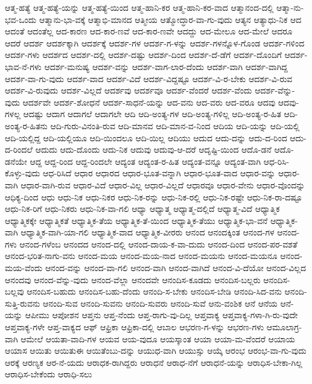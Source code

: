 {ಆತ್ಮ-ಹತ್ಯೆ
ಆತ್ಮ-ಹತ್ಯೆ-ಯನ್ನು
ಆತ್ಮ-ಹತ್ಯೆ-ಯಿಂದ
ಆತ್ಮ-ಹಾನಿ-ಕರ
ಆತ್ಮ-ಹಾನಿ-ಕರ-ವಾದ
ಆತ್ಮಾನಂದ-ದಲ್ಲಿ
ಆತ್ಮಾ-ನು-ಭವ-ಒಂದು
ಆತ್ಮಾನು-ಭಾ-ವಕ್ಕೆ
ಆತ್ಮಾಭಿ-ಮಾನದ
ಆತ್ಮೀಯ
ಆತ್ಮೋದ್ಧಾರ-ವಾ-ಗು-ವುದು
ಆತ್ಯನ
ಆತ್ಯಾಧು-ನಿಕ
ಆದ
ಆದಂತೆ
ಆದಂತೆಲ್ಲ
ಆದ-ಕಾರಣ
ಆದ-ಕಾರ-ಣವೆ
ಆದ-ಕಾರ-ಣವೇ
ಆದದ್ದು
ಆದ-ಮೇಲೂ
ಆದ-ಮೇಲೆ
ಆದರೂ
ಆದರೆ
ಆದರ್ಶ
ಆದರ್ಶಕ್ಕಾಗಿ
ಆದರ್ಶಕ್ಕೆ
ಆದರ್ಶ-ಗಳ
ಆದರ್ಶ-ಗ-ಳನ್ನು
ಆದರ್ಶ-ಗಳನ್ನೊಳ-ಗೊಂಡ
ಆದರ್ಶ-ಗಳಿಂದ
ಆದರ್ಶ-ಗಳು
ಆದರ್ಶದ
ಆದರ್ಶ-ದಲ್ಲಿ
ಆದರ್ಶ-ದಷ್ಟು
ಆದರ್ಶ-ದಿಂದ
ಆದರ್ಶ-ದೆ-ಡೆಗೆ
ಆದರ್ಶ-ದೊಂದಿಗೆ
ಆದರ್ಶ-ಭಾವ-ನೆ-ಗಳು
ಆದರ್ಶ-ಮನುಷ್ಯ
ಆದರ್ಶ-ವನ್ನು
ಆದರ್ಶ-ವಾಗ-ಲಾರ-ದೆಂದು
ಆದರ್ಶ-ವಾಗಿ
ಆದರ್ಶ-ವಾಗಿದ್ದ
ಆದರ್ಶ-ವಾ-ಗು-ವುದು
ಆದರ್ಶ-ವಾದ
ಆದರ್ಶ-ವಿದೆ
ಆದರ್ಶ-ವಿದ್ದಷ್ಟೂ
ಆದರ್ಶ-ವಿ-ರ-ಬೇಕು
ಆದರ್ಶ-ವಿ-ರುವ
ಆದರ್ಶ-ವಿ-ರುವುದು
ಆದರ್ಶ-ವಿಲ್ಲದೆ
ಆದರ್ಶವು
ಆದರ್ಶವೂ
ಆದರ್ಶ-ವೆಂದರೆ
ಆದರ್ಶ-ವೆಂದು
ಆದರ್ಶ-ವೆನ್ನು-ವುದು
ಆದರ್ಶವೇ
ಆದರ್ಶ-ಶೋಧನೆ
ಆದರ್ಶ-ಸಾಧನೆ-ಯನ್ನು
ಆದ-ವನು
ಆದ-ವರು
ಆದ-ವರೂ
ಆದವು
ಆದವು-ಗಳಲ್ಲ
ಆದಷ್ಟು
ಆದಾಗ
ಆದಾಗಲೆ
ಆದಾಗಲೇ
ಆದಿ
ಆದಿ-ಅಂತ್ಯ-ಗಳ
ಆದಿ-ಅಂತ್ಯ-ಗಳಿಲ್ಲ
ಆದಿ-ಅಂತ್ಯ-ರ-ಹಿತ
ಆದಿ-ಅಂತ್ಯ-ರ-ಹಿತನು
ಆದಿ-ಗುರು-ವಿನಂತಿ-ರುವ
ಆದಿ-ಮಾನವ
ಆದಿ-ಮಾನ-ವ-ನಿಂದ
ಆದಿಯ
ಆದಿ-ಯನ್ನು
ಆದಿ-ಯಲ್ಲಿ
ಆದಿ-ಯಲ್ಲಿದ್ದ
ಆದಿ-ಯಲ್ಲಿಯೂ
ಆದಿ-ಯಿಂದಲೂ
ಆದಿ-ಯಿಲ್ಲ
ಆದಿಯು
ಆದುದ
ಆದು-ದನ್ನು
ಆದು-ದ-ರಿಂದ
ಆದು-ದ-ರಿಂದಲೆ
ಆದುದು
ಆದು-ದೊಂದು
ಆದು-ನಿಕ
ಆದುವು
ಆದುವು-ಆ-ದರೆ
ಆದೃಷ್ಟಿ-ಯಿಂದ
ಆದೊ-ಡನೆ
ಆದೊ-ಡನೆಯೇ
ಆದ್ದ
ಆದ್ದ-ರಿಂದ
ಆದ್ದ-ರಿಂದಲೇ
ಆದ್ಯಂತ
ಆದ್ಯಂತ-ರ-ಹಿತ
ಆದ್ಯಂತ-ವನ್ನೂ
ಆದ್ಯಂತ-ವಾಗಿ
ಆಧ-ರಿಸಿ-ಕೊಳ್ಳು-ವುದು
ಆಧ-ರಿಸಿದೆ
ಆಧಾರ
ಆಧಾರದ
ಆಧಾರ-ಭೂತ-ವನ್ನಾಗಿ
ಆಧಾರ-ಭೂತ-ವಾದ
ಆಧಾರ-ವನ್ನು
ಆಧಾರ-ವಾಗಿ
ಆಧಾರ-ವಾಗಿ-ರುವ
ಆಧಾರ-ವಿದೆ
ಆಧಾರ-ವಿಲ್ಲ
ಆಧಾರ-ವಿಲ್ಲದೆ
ಆಧಾರವೂ
ಆಧಾರ-ವೇನು
ಆಧಾರ-ವೊಂದನ್ನು
ಆಧಿಕ್ಯ-ದಿಂದ
ಆಧು
ಆಧು-ನಿಕ
ಆಧು-ನಿಕರ
ಆಧು-ನಿಕ-ರನ್ನು
ಆಧು-ನಿಕ-ರಲ್ಲಿ
ಆಧು-ನಿಕ-ರಷ್ಟೇ
ಆಧು-ನಿಕ-ರಾ-ದಷ್ಟೂ
ಆಧು-ನಿಕ-ರಿಗೆ
ಆಧು-ನಿಕರು
ಆಧು-ನಿಕ-ವಾ-ಗಲಿ
ಆಧ್ಯಾ
ಆಧ್ಯಾತ್ಮ
ಆಧ್ಯಾತ್ಮ-ದಲ್ಲಿದೆ
ಆಧ್ಯಾತ್ಮ-ವಿದೆ
ಆಧ್ಯಾತ್ಮಿಕ
ಆಧ್ಯಾತ್ಮಿಕಕ್ಕೇ
ಆಧ್ಯಾತ್ಮಿಕತೆ
ಆಧ್ಯಾತ್ಮಿಕ-ತೆಯ
ಆಧ್ಯಾತ್ಮಿಕ-ತೆ-ಯಿಂದ
ಆಧ್ಯಾತ್ಮಿಕ-ತೆಯು
ಆಧ್ಯಾತ್ಮಿಕ-ಭಾ-ವನೆ
ಆಧ್ಯಾತ್ಮಿಕ-ವಾಗಿ
ಆಧ್ಯಾತ್ಮಿಕ-ವಾಗಿ-ಯಾ-ಗಲಿ
ಆಧ್ಯಾತ್ಮಿಕ-ವಾದ
ಆಧ್ಯಾತ್ಮಿಕ-ವೀರರು
ಆನಂದ
ಆನಂದಕ್ಕಿಂತ
ಆನಂದ-ಗಳ
ಆನಂದ-ಗಳು
ಆನಂದ-ಗಳೆಂಬ
ಆನಂದದ
ಆನಂದ-ದಲ್ಲಿ
ಆನಂದ-ದಾಯ-ಕ-ವಾ-ದುದು
ಆನಂದ-ದಿಂದ
ಆನಂದ-ಪರ-ವಶತೆ
ಆನಂದ-ಭರಿತ-ನಾಗು-ವನು
ಆನಂದ-ಮಯ
ಆನಂದ-ಮಯ-ನಾದ
ಆನಂದ-ಮಯನು
ಆನಂದ-ಮಯನೂ
ಆನಂದ-ಮಯ-ವೆಂದು
ಆನಂದ-ವನ್ನು
ಆನಂದ-ವಾ-ಗಲಿ
ಆನಂದ-ವಾಗಿ
ಆನಂದ-ವಾಗಿದೆ
ಆನಂದ-ವಿ-ದೆಯೋ
ಆನಂದ-ವಿಲ್ಲದ
ಆನಂದವು
ಆನಂದ-ವೆನ್ನು-ವುದು
ಆನಂದ-ವೆಲ್ಲಾ
ಆನಂದವೇ
ಆನಂದಿಸ-ಕೂಡದು
ಆನಂದಿಸ-ಬಲ್ಲರು
ಆನಂದಿಸ-ಬಲ್ಲವು
ಆನಂದಿಸ-ಬಹುದು
ಆನಂದಿಸ-ಬಹು-ದೆಂದು
ಆನಂದಿ-ಸ-ಬೇಕು
ಆನಂದಿಸ-ಬೇಡಿ
ಆನಂದಿ-ಸಿದ-ವನು
ಆನಂದಿ-ಸುತ್ತಿ-ರುವನು
ಆನಂದಿ-ಸುವ
ಆನಂದಿ-ಸುವನು
ಆನಂದಿ-ಸುವರು
ಆನಂದಿ-ಸುವೆ
ಆನು-ವಂಶಿಕ
ಆನೆ
ಆನೆಯ
ಆನೆ-ಯನ್ನು
ಆಪೀಮು
ಆಪೋಶನ
ಆಪ್ತನು
ಆಪ್ತ-ನೆಂದು
ಆಪ್ತ-ರಾಗು-ವು-ದಿಲ್ಲ
ಆಪ್ತವಾಕ್ಯ
ಆಪ್ತವಾಕ್ಯ-ಗಳಾ-ಗಿ-ರು-ವುದೇ
ಆಪ್ತವಾಕ್ಯ-ಗಳೇ
ಆಪ್ತ-ವಾಕ್ಯದ
ಆಫ್
ಆಫ್ರಿಕಾ
ಆಫ್ರಿಕಾ-ದಲ್ಲಿ
ಆಬಾಲ
ಆಭರಣ-ಗ-ಳನ್ನು
ಆಭರಣ-ಗಳು
ಆಮೂಲಾಗ್ರ-ವಾಗಿ
ಆಮೇಲೆ
ಆಯತಾ-ವಾದಿ-ಗಳ
ಆಯವ
ಆಯ-ವುದೂ
ಆಯಸ್ಕಾಂತ
ಆಯಾ
ಆಯಾ-ಮ-ವೆಂದರೆ
ಆಯಾಯ
ಆಯಾಸ
ಆಯಿತು
ಆಯಿತುಈ
ಆಯಿತೆಂಬು-ದನ್ನು
ಆಯುಧ-ವಾಗಿ
ಆಯುಸ್ಸು
ಆಯ್ಕೆ
ಆರಂಭ
ಆರಂಭ-ವಾ-ಗು-ವುದು
ಆರಕ್ಕೆ
ಆರಣ್ಯಕ
ಆರ-ನೆ-ಯದು
ಆರಾಧಕ-ರಾಗಿದ್ದರು
ಆರಾಧನೆ
ಆರಾಧ-ನೆಗೆ
ಆರಾಧನೆ-ಯನ್ನು
ಆರಾಧಿಸ-ಬೇಕಾ-ಗಿಲ್ಲ
ಆರಾಧಿಸ-ಬೇಕೆಂದು
ಆರಾಧಿ-ಸಲು
}
